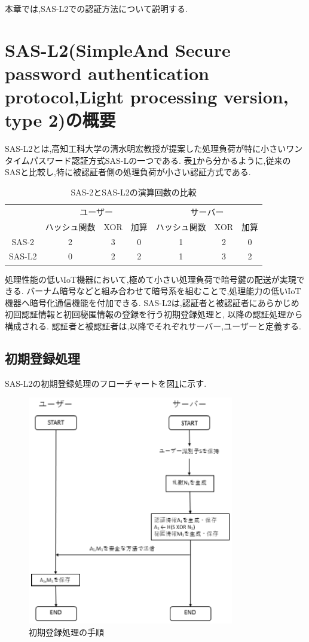 
本章では,SAS-L2での認証方法について説明する.
\section{SAS-L2(SimpleAnd Secure password authentication protocol,Light processing version, type 2)の概要}
SAS-L2とは,高知工科大学の清水明宏教授が提案した処理負荷が特に小さいワンタイムパスワード認証方式SAS-Lの一つである\cite{sas-l}.
表\ref{tb:sashikaku}から分かるように,従来のSASと比較し,特に被認証者側の処理負荷が小さい認証方式である.

\begin{table}[H]
\centering
\caption{SAS-2とSAS-L2の演算回数の比較}
\label{tb:sashikaku}
\begin{tabular}{|c|c|c|c|c|c|c|} \hline
 & \multicolumn{3}{c|}{ユーザー} & \multicolumn{3}{c|}{サーバー} \\
 \cline{2-7}
  & ハッシュ関数 & XOR & 加算 & ハッシュ関数 & XOR & 加算\\ \hline
  SAS-2 & 2 & 3 & 0 & 1 & 2 & 0\\ \hline
  SAS-L2 & 0 & 2 & 2 & 1 & 3 & 2\\ \hline
  \end{tabular}
  \end{table}

処理性能の低いIoT機器において,極めて小さい処理負荷で暗号鍵の配送が実現できる.
バーナム暗号などと組み合わせて暗号系を組むことで,処理能力の低いIoT機器へ暗号化通信機能を付加できる\cite{sas-l}.
SAS-L2は,認証者と被認証者にあらかじめ初回認証情報と初回秘匿情報の登録を行う初期登録処理と,
以降の認証処理から構成される.
認証者と被認証者は,以降でそれぞれサーバー,ユーザーと定義する.


\subsection{初期登録処理}
SAS-L2の初期登録処理のフローチャートを図\ref{fig:sas-l2_syoki}に示す.

\begin{figure}[H]
\begin{center}
	\includegraphics[height=100mm]{sas_l2_syoki.eps}
	\caption{初期登録処理の手順}
\label{fig:sas-l2_syoki}
\end{center}
\end{figure}


